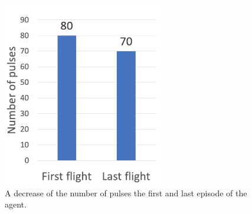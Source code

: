 \documentclass[../main]{subfiles}
\begin{document}
\newpage
{}
\begin{figure}[H]
  \centering
  \vfill
  \includegraphics[width=7cm]{figures/agent_pulses.png}
  \caption{
    A decrease of the number of pulses 
    the first and last episode of the agent.
  }\label{fig:agent_pulse}
\end{figure}
\end{document}
